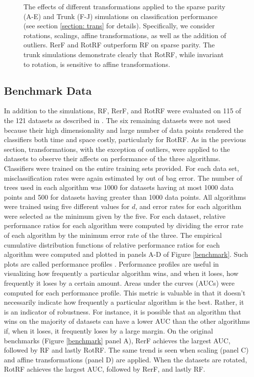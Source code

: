 \documentclass{article}
\begin{document}
\begin{figure}[ht]
\begin{center}
\caption{The effects of different transformations applied to the sparse parity (A-E) and Trunk (F-J) simulations on classification performance (see section \ref{section: trans} for details). Specifically, we consider rotations, scalings, affine transformations, as well as the addition of outliers. RerF and RotRF outperform RF on sparse parity. The trunk simulations demonstrate clearly that RotRF, while invariant to rotation, is sensitive to affine transformations.}
\label{transformations}
\end{center}
\vskip -0.2in
\end{figure}

\subsection{Benchmark Data}
\label{section: benchmark}

In addition to the simulations, RF, RerF, and RotRF were evaluated on 115 of the 121 datasets as described in \cite{Delgado2014}. The six remaining datasets were not used because their high dimensionality and large number of data points rendered the classifiers both time and space costly, particularly for RotRF. As in the previous section, transformations, with the exception of outliers, were applied to the datasets to observe their affects on performance of the three algorithms. Classifiers were trained on the entire training sets provided. For each data set, misclassification rates were again estimated by out of bag error. The number of trees used in each algorithm was 1000 for datasets having at most 1000 data points and 500 for datasets having greater than 1000 data points. All algorithms were trained using five different values for $d$, and error rates for each algorithm were selected as the minimum given by the five. For each dataset, relative performance ratios for each algorithm were computed by dividing the error rate of each algorithm by the minimum error rate of the three. The empirical cumulative distribution functions of relative performance ratios for each algorithm were computed and plotted in panels A-D of Figure \ref{benchmark}. Such plots are called performance profiles \cite{Dolan2002}. Performance profiles are useful in visualizing how frequently a particular algorithm wins, and when it loses, how frequently it loses by a certain amount. Areas under the curves (AUCs) were computed for each performance profile. This metric is valuable in that it doesn't necessarily indicate how frequently a particular algorithm is the best. Rather, it is an indicator of robustness. For instance, it is possible that an algorithm that wins on the majority of datasets can have a lower AUC than the other algorithms if, when it loses, it frequently loses by a large margin. On the original benchmarks (Figure \ref{benchmark} panel A), RerF achieves the largest AUC, followed by RF and lastly RotRF. The same trend is seen when scaling (panel C) and affine transformations (panel D) are applied. When the datasets are rotated, RotRF achieves the largest AUC, followed by RerF, and lastly RF.
\end{document}
